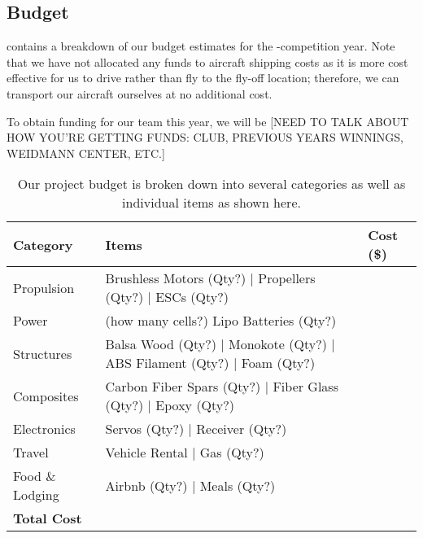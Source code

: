 \subsection{Budget}
\label{ssec:Budget}

 contains a breakdown of our budget estimates for the \the\year-\NextYear competition year. Note that we have not allocated any funds to aircraft shipping costs as it is more cost effective for us to drive rather than fly to the fly-off location; therefore, we can transport our aircraft ourselves at no additional cost. %

To obtain funding for our team this year, we will be {\color{BYUred}[NEED TO TALK ABOUT HOW YOU'RE GETTING FUNDS: CLUB, PREVIOUS YEARS WINNINGS, WEIDMANN CENTER, ETC.]} %
\lipsum[2]

\begin{table}[htb!]
	\centering
	\renewcommand{\arraystretch}{1.2}
	\caption{Our project budget is broken down into several categories as well as individual items as shown here.}
	\label{tab:budget}
	\begin{tabular}{ |l|l|l| } 
		\hline
		\rowcolor{BYUbluemid}
		Category & Items & Cost (\$) \\ 
		\hline
		Propulsion &  Brushless Motors (Qty?) | Propellers (Qty?) | ESCs (Qty?) &  \\
		\hline
		Power & (how many cells?) Lipo Batteries (Qty?) & \\ 
		\hline
		Structures & Balsa Wood (Qty?) | Monokote (Qty?) | ABS Filament (Qty?) | Foam (Qty?) & \\ 
		\hline
		Composites & Carbon Fiber Spars (Qty?) | Fiber Glass (Qty?) | Epoxy (Qty?) &  \\ 
		\hline
		Electronics & Servos (Qty?) | Receiver (Qty?) &  \\
		\hline
		Travel & Vehicle Rental | Gas (Qty?) &  \\
		\hline
		Food \& Lodging & Airbnb (Qty?) | Meals (Qty?) &  \\
		\hline 
		\textbf{Total Cost} & & \textbf{} \\ 
		\hline
		
	\end{tabular}
\end{table}
